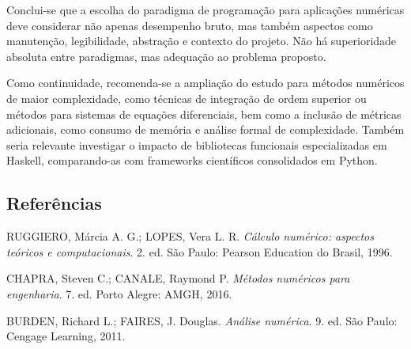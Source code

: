 Conclui-se que a escolha do paradigma de programação para aplicações numéricas
deve considerar não apenas desempenho bruto, mas também aspectos como
manutenção, legibilidade, abstração e contexto do projeto. Não há superioridade
absoluta entre paradigmas, mas adequação ao problema proposto.

Como continuidade, recomenda-se a ampliação do estudo para métodos numéricos de
maior complexidade, como técnicas de integração de ordem superior ou métodos
para sistemas de equações diferenciais, bem como a inclusão de métricas
adicionais, como consumo de memória e análise formal de complexidade. Também
seria relevante investigar o impacto de bibliotecas funcionais especializadas
em Haskell, comparando-as com frameworks científicos consolidados em Python.

\subsection{Referências}

RUGGIERO, Márcia A. G.; LOPES, Vera L. R.
\textit{Cálculo numérico: aspectos teóricos e computacionais}.
2. ed. São Paulo: Pearson Education do Brasil, 1996.

CHAPRA, Steven C.; CANALE, Raymond P.
\textit{Métodos numéricos para engenharia}.
7. ed. Porto Alegre: AMGH, 2016.

BURDEN, Richard L.; FAIRES, J. Douglas.
\textit{Análise numérica}.
9. ed. São Paulo: Cengage Learning, 2011.